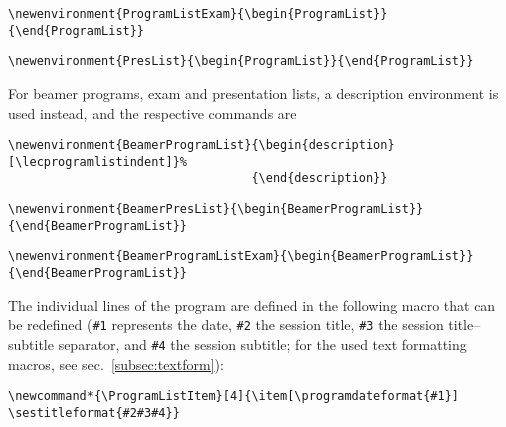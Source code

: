 \documentclass[english]{article}
\begin{document}
\begin{lstlisting}[language={[LaTeX]TeX},basicstyle={\small\ttfamily},frame=single]
\newenvironment{ProgramListExam}{\begin{ProgramList}}{\end{ProgramList}}
\end{lstlisting}
%
\begin{lstlisting}[language={[LaTeX]TeX},basicstyle={\small\ttfamily},frame=single]
\newenvironment{PresList}{\begin{ProgramList}}{\end{ProgramList}}
\end{lstlisting}
%
For beamer programs, exam and presentation lists, a description environment is used instead,
and the respective commands are
\begin{lstlisting}[language={[LaTeX]TeX},basicstyle={\small\ttfamily},
frame=single,moretexcs={[1]{lecprogramlistindent}}]
\newenvironment{BeamerProgramList}{\begin{description}[\lecprogramlistindent]}%
                                  {\end{description}}
\end{lstlisting}
%
\begin{lstlisting}[language={[LaTeX]TeX},basicstyle={\small\ttfamily},
frame=single,moretexcs={[1]{lecprogramlistindent}}]
\newenvironment{BeamerPresList}{\begin{BeamerProgramList}}{\end{BeamerProgramList}}
\end{lstlisting}
%
\begin{lstlisting}[language={[LaTeX]TeX},basicstyle={\small\ttfamily},
frame=single,moretexcs={[1]{lecprogramlistindent}}]
\newenvironment{BeamerProgramListExam}{\begin{BeamerProgramList}}{\end{BeamerProgramList}}
\end{lstlisting}
%
The individual lines of the program are defined in the following macro that can be redefined
(\texttt{\#1} represents the date, \texttt{\#2} the session title, \texttt{\#3} the session title--subtitle separator,
and \texttt{\#4} the session subtitle; for the used text formatting macros, see sec.~\ref{subsec:textform}):
\begin{lstlisting}[language={[LaTeX]TeX},basicstyle={\small\ttfamily},
frame=single,moretexcs={[3]{ProgramListItem,programdateformat,sestitleformat}}]
\newcommand*{\ProgramListItem}[4]{\item[\programdateformat{#1}] \sestitleformat{#2#3#4}}
\end{lstlisting}
\end{document}
